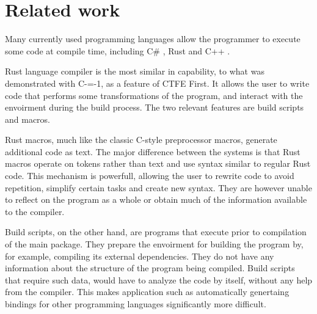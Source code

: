 \section{Related work}
\label{related-work}

Many currently used programming languages allow the programmer to execute some code at compile time, including C\# \cite{csharp:source_generators,roslyn}, Rust \cite{rust, klabnik2019rust} and C++ \cite{ISO:cpp20}.

Rust language compiler is the most similar in capability, to what was demonstrated with C-=-1, as a feature of CTFE First.
It allows the user to write code that performs some transformations of the program, and interact with the envoirment during the build process.
The two relevant features are build scripts and macros.

Rust macros, much like the classic C-style preprocessor macros, generate additional code as text.
The major difference between the systems is that Rust macros operate on tokens rather than text and use syntax similar to regular Rust code.
This mechanism is powerfull, allowing the user to rewrite code to avoid repetition, simplify certain tasks and create new syntax.
They are however unable to reflect on the program as a whole or obtain much of the information available to the compiler.

Build scripts, on the other hand, are programs that execute prior to compilation of the main package.
They prepare the envoirment for building the program by, for example, compiling its external dependencies.
They do not have any information about the structure of the program being compiled.
Build scripts that require such data, would have to analyze the code by itself, without any help from the compiler.
This makes application such as automatically genertaing bindings for other programming languages significantly more difficult.
